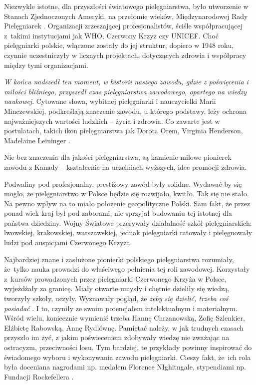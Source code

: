 \documentclass[a4paper,12pt,twoside,openright]{mwrep}
\begin{document}
Niezwykle istotne, dla przyszłości światowego pielęgniarstwa, było utworzenie w Stanach Zjednoczonych Ameryki, na przełomie wieków, Międzynarodowej Rady Pielęgniarek \cite{rada}. Organizacji zrzeszającej profesjonalistów, ściśle współpracującej z~takimi instytucjami jak WHO, Czerwony Krzyż czy UNICEF. Choć pielęgniarki polskie, włączone zostały do jej struktur, dopiero w 1948 roku, czynnie uczestniczyły w licznych projektach, dotyczących zdrowia i współpracy między tymi organizacjami.

\textit{W końcu nadszedł ten moment, w historii naszego zawodu, gdzie z poświęcenia i miłości bliźniego, przyszedł czas pielęgniarstwa zawodowego, opartego na wiedzy naukowej}. Cytowane słowa, wybitnej pielęgniarki i nauczycielki Marii Minczewskiej, podkreślają znaczenie zawodu, u którego podstawy, leży  ochrona najważniejszych wartości ludzkich – życia i zdrowia.  Co zawarte jest w postulatach, takich ikon pielęgniarstwa jak Dorota Orem, Virginia Henderson, Madelaine Leininger \cite{ikon}.

Nie bez znaczenia dla jakości pielęgniarstwa, są kamienie milowe pionierek zawodu z Kanady – kształcenie na uczelniach wyższych, idee promocji zdrowia.

Podwaliny pod profesjonalny, prestiżowy zawód były solidne. Wydawać by się mogło, że pielęgniarstwo w Polsce będzie się rozwijało, kwitło. Tak się nie stało. Na pewno wpływ na to miało położenie geopolityczne Polski. Sam fakt, że przez ponad wiek kraj był pod zaborami, nie sprzyjał budowaniu tej istotnej dla państwa dziedziny. Wojny Światowe przerywały działalność szkół pielęgniarskich: lwowskiej, krakowskiej, warszawskiej, jednak pielęgniarki ratowały i pielęgnowały ludzi pod auspicjami Czerwonego Krzyża.

Najbardziej znane i zasłużone pionierki polskiego pielęgniarstwa rozumiały, że~tylko nauka prowadzi do właściwego pełnienia tej roli zawodowej. Korzystały z~kursów prowadzonych przez pielęgniarki Czerwonego Krzyża  w Polsce, wyjeżdżały za granicę. Miały otwarte umysły i chętnie dzieliły się wiedzą, tworzyły szkoły, uczyły.  Wyznawały pogląd, że  \textit{żeby się dzielić, trzeba coś posiadać} \cite{ikonpol}. I to, czyniły ze swoim potencjałem intelektualnym i materialnym. Wśród wielu, koniecznie wymienić trzeba Hannę Chrzanowską, Zofię Szlenkier, Elżbietę Rabowską, Annę Rydlównę. Pamiętać należy, w jak trudnych czasach przyszło im żyć, z jakim poświeceniem zdobywały wiedzę nie zważając na ostracyzm, przeciwności losu. Tym bardziej, te przykłady powinny inspirować do świadomego wyboru i wykonywania zawodu pielęgniarki. Cieszy fakt, że~ich rola była doceniana nagrodami np. medalem Florence NIghitngale, stypendiami np. Fundacji Rockefellera \cite{50}.
\end{document}
